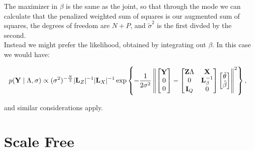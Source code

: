 \documentclass[10pt]{article}
\begin{document}
The maximizer in $\beta$ is the same as the joint, so that through the
mode we can calculate that the penalized weighted sum of squares is
our augmented sum of squares, the degrees of freedom are $N+P$, and
$\tilde\sigma^2$ is the first divded by the second. \\

Instead we might prefer the likelihood, obtained by integrating out
$\beta$. In this case we would have:

\begin{equation*}
p({\bf Y} \mid  \Lambda, \sigma) \propto
(\sigma^2)^{-\frac{N}{2}}|{\bf L}_Z|^{-1}|{\bf L}_X|^{-1}
\exp\left\{-\frac{1}{2\sigma^2}
\left\|
\begin{bmatrix}{\bf Y} \\ 0 \\ 0 \end{bmatrix} -
\begin{bmatrix}{\bf Z}\Lambda & {\bf X} \\
0 & {\bf L}_\beta^{-1} \\
{\bf I}_Q & 0
\end{bmatrix}
\begin{bmatrix} \tilde\theta \\ \tilde\beta \end{bmatrix}
\right\|^2
\right\},
\end{equation*}

\noindent and similar considerations apply.

\section*{Scale Free}
\end{document}
